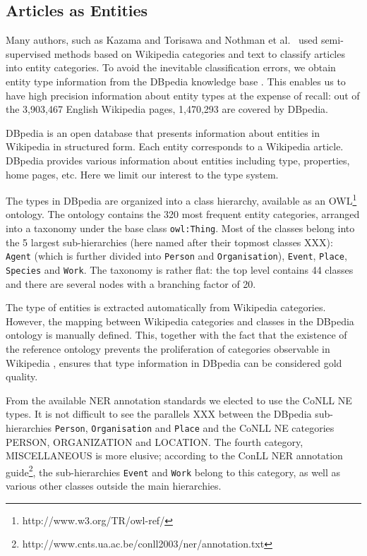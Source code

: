 \documentclass[11pt]{article}
\begin{document}
\subsection{Articles as Entities}
\label{dbpedia}

Many authors, such as Kazama and Torisawa  and Nothman et al.~ used semi-supervised methods based on Wikipedia categories and text to classify articles into entity categories. To avoid the inevitable classification errors, we obtain entity type information from the DBpedia knowledge base \cite{Bizer:09}. This enables us to have high precision information about entity types at the expense of recall: out of the 3,903,467 English Wikipedia pages, 1,470,293 are covered by DBpedia.

DBpedia is an open database that presents information about entities in Wikipedia in structured form. Each entity corresponds to a Wikipedia article. DBpedia provides various information about entities including type, properties, home pages, etc. Here we limit our interest to the type system.

The types in DBpedia are organized into a class hierarchy, available as an OWL\footnote{http://www.w3.org/TR/owl-ref/} ontology. The ontology contains the 320 most frequent entity categories, arranged into a taxonomy under the base class \texttt{owl:Thing}. Most of the classes belong into the 5 largest sub-hierarchies (here named after their topmost classes XXX): \texttt{Agent} (which is further divided into \texttt{Person} and \texttt{Organisation}), \texttt{Event}, \texttt{Place}, \texttt{Species} and \texttt{Work}. The taxonomy is rather flat: the top level contains 44 classes and there are several nodes with a branching factor of 20.

The type of entities is extracted automatically from Wikipedia categories. However, the mapping between Wikipedia categories and classes in the DBpedia ontology is manually defined. This, together with the fact that the existence of the reference ontology prevents the proliferation of categories observable in Wikipedia \cite{Bizer:09}, ensures that type information in DBpedia can be considered gold quality.

From the available NER annotation standards we elected to use the CoNLL \cite{Tjong:03} NE types. It is not difficult to see the parallels XXX between the DBpedia sub-hierarchies \texttt{Person}, \texttt{Organisation} and \texttt{Place} and the CoNLL NE categories PERSON, ORGANIZATION and LOCATION. The fourth category, MISCELLANEOUS is more elusive; according to the ConLL NER annotation guide\footnote{http://www.cnts.ua.ac.be/conll2003/ner/annotation.txt}, the sub-hierarchies \texttt{Event} and \texttt{Work} belong to this category, as well as various other classes outside the main hierarchies. 
\end{document}
